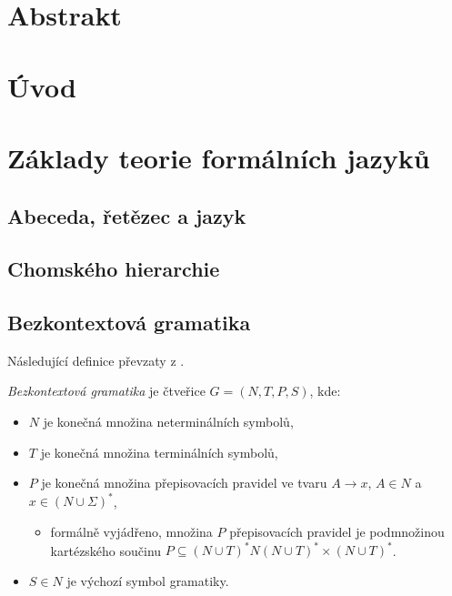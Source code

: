 
%

\chapter{Abstrakt}\label{kap_abstrakt}

\chapter{Úvod}\label{kap_uvod}


\chapter{Základy teorie formálních jazyků}\label{kap_teorie}

\section{Abeceda, řetězec a jazyk}
\section{Chomského hierarchie}
\section{Bezkontextová gramatika}
Následující definice převzaty z \cite{TIN-opora}.
\begin{definition}\label{def_bkg}
    \emph{Bezkontextová gramatika} je čtveřice $G = (N, T, P, S)$, kde:
    \begin{itemize}
        \item $N$ je konečná množina neterminálních symbolů,
        \item $T$ je konečná množina terminálních symbolů,
        \item $P$ je konečná množina přepisovacích pravidel ve tvaru $A \rightarrow x$, $A \in N$ a $x \in (N \cup \Sigma)^*$,
        \begin{itemize}[label=$\circ$]
            \item formálně vyjádřeno, množina $P$ přepisovacích pravidel je podmnožinou kartézského součinu $P \subseteq (N \cup T)^* N (N \cup T)^* \times (N \cup T)^*$. 
        \end{itemize}
        \item $S \in N$ je výchozí symbol gramatiky.
    \end{itemize}
\end{definition}

